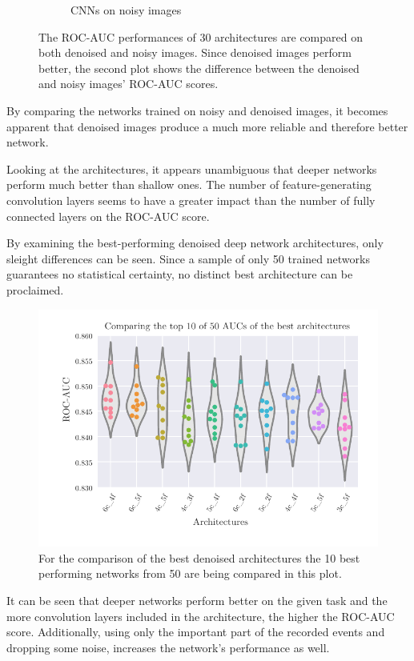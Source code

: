 \begin{figure}
\begin{subfigure}{.5\textwidth}
  \caption{CNNs on noisy images}
  \label{fig:heatmap_noised}
\end{subfigure}
\caption{The ROC-AUC performances of \num{30} architectures are compared on both denoised and noisy images. Since denoised images perform better, the second plot shows the difference between the denoised and noisy images' ROC-AUC scores.}
\label{fig:heatmaps}
\end{figure}

By comparing the networks trained on noisy and denoised images, it becomes apparent
that denoised images produce a much more reliable and therefore better network.

Looking at the architectures, it appears unambiguous that deeper networks perform much better than shallow ones.
The number of feature-generating convolution layers seems to have a greater impact
than the number of fully connected layers on the ROC-AUC score.

By examining the best-performing denoised deep network architectures,
only sleight differences can be seen.
Since a sample of only \num{50} trained networks guarantees no statistical certainty,
no distinct best architecture can be proclaimed.

\begin{figure}
    \centering
    \includegraphics[scale=1]{Plots/Best_denoised_architectures.pdf}
    \caption{For the comparison of the best denoised architectures the \num{10} best performing networks from \num{50} are being compared in this plot.}
    \label{fig:top_cnn_architectures}
\end{figure}

It can be seen that deeper networks perform better on the given task
and the more convolution layers included in the architecture, the higher the ROC-AUC score.
Additionally, using only the important part of the recorded events
and dropping some noise, increases the network's performance as well.

